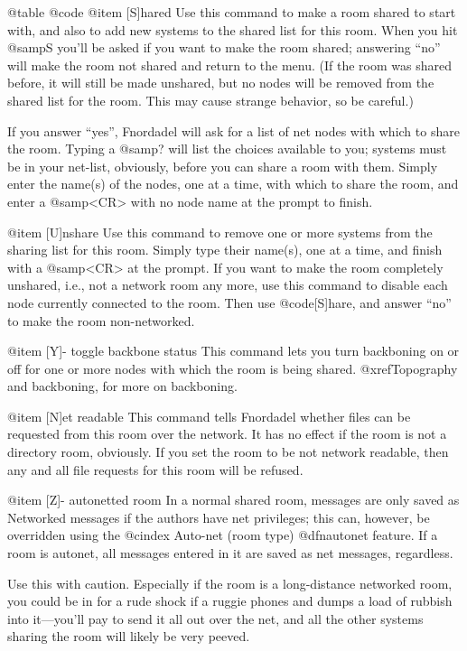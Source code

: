 @table @code
@item [S]hared
Use this command to make a room shared to start
with, and also to add new systems to the shared list for
this room.  When you hit @samp{S} you'll be asked if you want
to make the room shared; answering ``no'' will make the room
not shared and return to the menu.  (If the room was shared
before, it will still be made unshared, but no nodes will be
removed from the shared list for the room.  This may cause
strange behavior, so be careful.)

If you answer ``yes'', Fnordadel will ask for a
list of net nodes with which to share the room.  Typing
a @samp{?} will list the choices available to you; systems
must be in your net-list, obviously, before you can share
a room with them.  Simply enter the name(s) of the nodes, one at a time,
with which to share the room, and enter a @samp{<CR>}
with no node name at the prompt to finish.

@item [U]nshare
Use this command to remove one or more systems
from the sharing list for this room.  Simply type their
name(s), one at a time, and finish with a @samp{<CR>} at the prompt.  If you
want to make the room completely unshared, i.e., not a
network room any more, use this command to disable each
node currently connected to the room.  Then use @code{[S]hare}, and answer
``no'' to make the room non-networked.

@item [Y]- toggle backbone status
This command lets you turn backboning on
or off for one or more nodes with which the room is being shared.
@xref{Topography and backboning}, for more on backboning.

@item [N]et readable
This command tells Fnordadel whether files can
be requested from this room over the network.  It has no
effect if the room is not a directory room, obviously.
If you set the room to be not network readable, then any
and all file requests for this room will be refused.

@item [Z]- autonetted room
In a normal shared room, messages are only saved as
Networked messages if the authors have net privileges; this
can, however, be overridden using the
@cindex Auto-net (room type)
@dfn{autonet} feature.
If a room is autonet, all messages entered in it are saved
as net messages, regardless.

Use this with caution.  Especially if the room is a
long-distance networked room, you could be in for a rude
shock if a ruggie phones and dumps a load of rubbish into
it---you'll pay to send it all out over the net, and all
the other systems sharing the room will likely be very
peeved.

